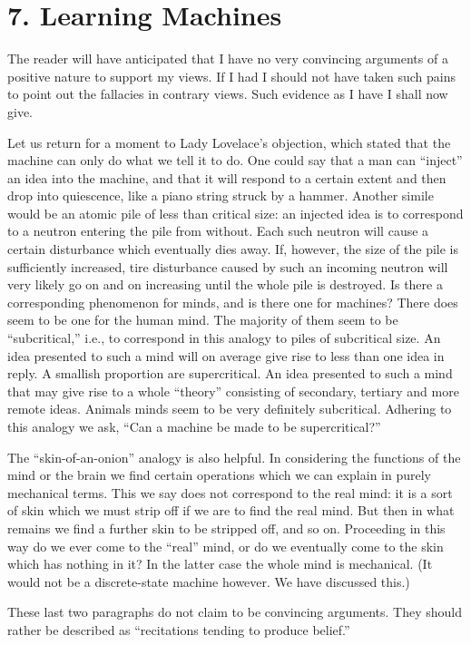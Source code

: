 \documentclass[10pt,twoside,openright]{memoir}
\begin{document}
\section{7. Learning Machines}

The reader will have anticipated that I have no very convincing arguments of a positive nature to support my views. If I had I should not have taken such pains to point out the fallacies in contrary views. Such evidence as I have I shall now give.

Let us return for a moment to Lady Lovelace's objection, which stated that the machine can only do what we tell it to do. One could say that a man can ``inject'' an idea into the machine, and that it will respond to a certain extent and then drop into quiescence, like a piano string struck by a hammer. Another simile would be an atomic pile of less than critical size: an injected idea is to correspond to a neutron entering the pile from without. Each such neutron will cause a certain disturbance which eventually dies away. If, however, the size of the pile is sufficiently increased, tire disturbance caused by such an incoming neutron will very likely go on and on increasing until the whole pile is destroyed. Is there a corresponding phenomenon for minds, and is there one for machines? There does seem to be one for the human mind. The majority of them seem to be ``subcritical,'' i.e., to correspond in this analogy to piles of subcritical size. An idea presented to such a mind will on average give rise to less than one idea in reply. A smallish proportion are supercritical. An idea presented to such a mind that may give rise to a whole ``theory'' consisting of secondary, tertiary and more remote ideas. Animals minds seem to be very definitely subcritical. Adhering to this analogy we ask, ``Can a machine be made to be supercritical?''

The ``skin-of-an-onion'' analogy is also helpful. In considering the functions of the mind or the brain we find certain operations which we can explain in purely mechanical terms. This we say does not correspond to the real mind: it is a sort of skin which we must strip off if we are to find the real mind. But then in what remains we find a further skin to be stripped off, and so on. Proceeding in this way do we ever come to the ``real'' mind, or do we eventually come to the skin which has nothing in it? In the latter case the whole mind is mechanical. (It would not be a discrete-state machine however. We have discussed this.)

These last two paragraphs do not claim to be convincing arguments. They should rather be described as ``recitations tending to produce belief.''
\end{document}
